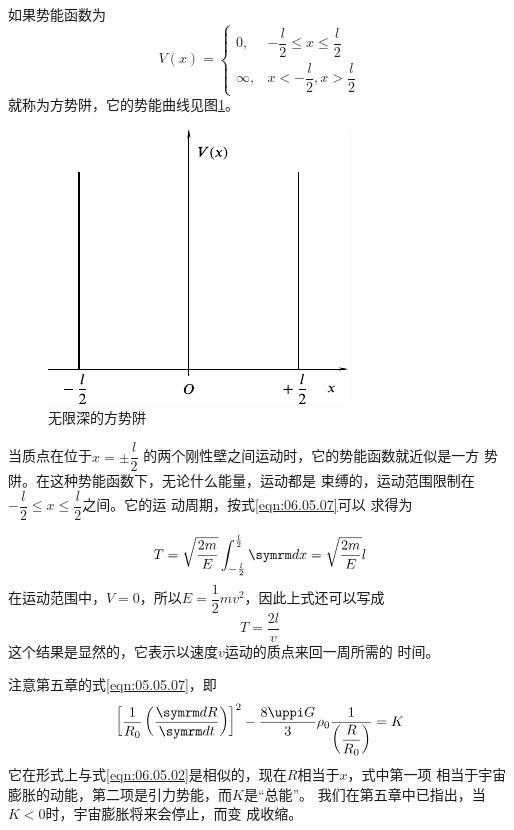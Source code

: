 \example 如果势能函数为
\begin{equation*}
  V \left( x \right) = \begin{cases}
    0,      & - \dfrac { l }{ 2 } \leqslant x \leqslant \dfrac { l } { 2 } \\
    \infty, & x < - \dfrac { l } { 2 }, x > \dfrac { l } { 2 }
  \end{cases}
\end{equation*}
就称为方势阱，它的势能曲线见图\ref{fig:06.13}。

\begin{figure}
  \vspace{-2em}
  \centering
  \includegraphics{figure/fig06.13}
  \caption{无限深的方势阱}
  \label{fig:06.13}
\end{figure}
当质点在位于$ x = \pm \dfrac { l } { 2 } $
的两个刚性壁之间运动时，它的势能函数就近似是一方
势阱。在这种势能函数下，无论什么能量，运动都是
束缚的，运动范围限制在
$ - \dfrac { l } { 2 } \leqslant x \leqslant \dfrac { l } { 2 } $之间。它的运
动周期，按式\eqref{eqn:06.05.07}可以
求得为

\begin{equation*}
  T = \sqrt { \frac { 2 m } { E } } \int _ { - \frac { l } { 2 } } ^ { \frac { l } { 2 } } \dif x = \sqrt { \frac { 2 m } { E } } l
\end{equation*}
在运动范围中，$ V = 0 $，所以$ E = \dfrac { 1 } { 2 } m v ^ { 2 } $，因此上式还可以写成
\begin{equation*}
  T = \frac { 2 l } { v }
\end{equation*}
这个结果是显然的，它表示以速度$ v $运动的质点来回一周所需的
时间。

\clearpage
\example 注意第五章的式\eqref{eqn:05.05.07}，即
\begin{equation}\label{eqn:06.05.08}
  \left[ \frac { 1 } { R _ { 0 } } \left( \frac { \dif R } { \dif t } \right) \right] ^ { 2 }- \frac { 8 \uppi G } { 3 } \rho _ 0 \frac { 1 } { \left( \dfrac { R } { R _ { 0 } } \right) } = K
\end{equation}
它在形式上与式\eqref{eqn:06.05.02}是相似的，现在$ R $相当于$ x $，式中第一项
相当于宇宙膨胀的动能，第二项是引力势能，而$ K $是“总能”。
我们在第五章中已指出，当$ K < 0 $时，宇宙膨胀将来会停止，而变
成收缩。

